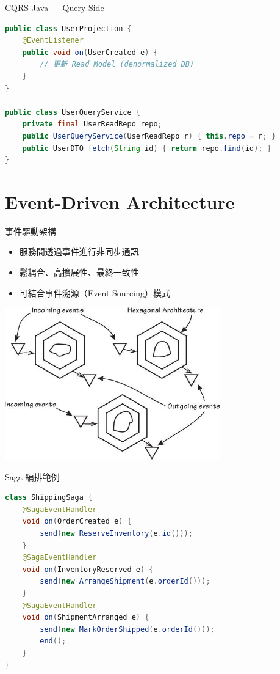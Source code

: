 \documentclass[UTF8]{beamer}
\begin{document}
\begin{frame}[fragile]{CQRS Java — Query Side}
    \begin{lstlisting}[language=Java]
public class UserProjection {
    @EventListener
    public void on(UserCreated e) {
        // 更新 Read Model (denormalized DB)
    }
}

public class UserQueryService {
    private final UserReadRepo repo;
    public UserQueryService(UserReadRepo r) { this.repo = r; }
    public UserDTO fetch(String id) { return repo.find(id); }
}
\end{lstlisting}
\end{frame}


\section{Event-Driven Architecture}
\begin{frame}{事件驅動架構}
    \begin{itemize}
        \item 服務間透過事件進行非同步通訊
        \item 鬆耦合、高擴展性、最終一致性
        \item 可結合事件溯源（Event Sourcing）模式
    \end{itemize}
    \begin{center}
        \includegraphics[width=0.7\textwidth]{img/event-driven-hex.png}
    \end{center}
\end{frame}

\begin{frame}[fragile]{Saga 編排範例}
    \begin{lstlisting}[language=Java]
class ShippingSaga {
    @SagaEventHandler
    void on(OrderCreated e) {
        send(new ReserveInventory(e.id()));
    }
    @SagaEventHandler
    void on(InventoryReserved e) {
        send(new ArrangeShipment(e.orderId()));
    }
    @SagaEventHandler
    void on(ShipmentArranged e) {
        send(new MarkOrderShipped(e.orderId()));
        end();
    }
}
\end{lstlisting}
\end{frame}
\end{document}
